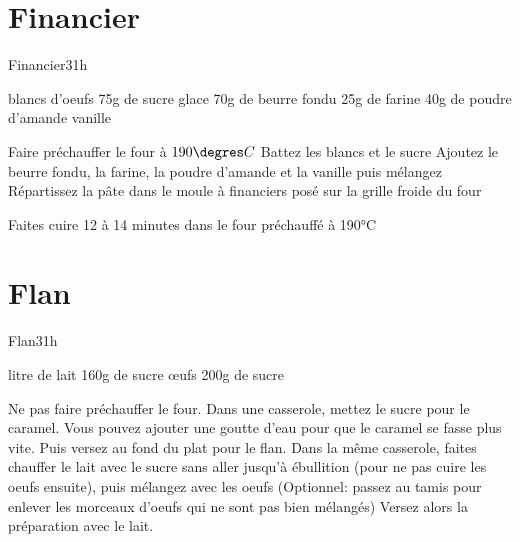 {\section{Financier}
\begin{recette}{Financier}{3}{}{1h}
\begin{ingredients}
 blancs d'oeufs
\ingredient 75g de sucre glace
\ingredient 70g de beurre fondu
\ingredient 25g de farine
\ingredient 40g de poudre d'amande
\ingredient vanille
\end{ingredients}

\begin{preparation}
\etape Faire préchauffer le four à $190\degres C$
\etape Battez les blancs et le sucre 
\etape Ajoutez le beurre fondu, la farine, la poudre d'amande et la vanille puis mélangez
\etape Répartissez  la pâte dans le moule à financiers posé sur la grille froide du four
\end{preparation}

\begin{cuisson}
Faites cuire 12 à 14 minutes dans le four préchauffé à 190°C
\end{cuisson}
\end{recette}

\section{Flan}
\begin{recette}{Flan}{3}{}{1h}
\begin{ingredients}[8 personnes]
\ingredient[Flan]
 litre de lait
\ingredient 160g de sucre
 œufs
\ingredient[Caramel]
\ingredient 200g de sucre %
\end{ingredients}

\begin{preparation}
\etape Ne pas faire préchauffer le four.
\etape Dans une casserole, mettez le sucre pour le caramel. Vous pouvez ajouter une goutte d'eau pour que le caramel se fasse plus 
vite. Puis versez au fond du plat pour le flan.
\etape Dans la même casserole, faites chauffer le lait avec le sucre sans aller jusqu'à ébullition (pour ne pas cuire les oeufs ensuite), puis mélangez avec les oeufs (Optionnel: passez au tamis pour enlever les morceaux d'oeufs qui ne sont pas bien mélangés)
\etape Versez alors la préparation avec le lait.
\end{preparation}


\end{recette}}
